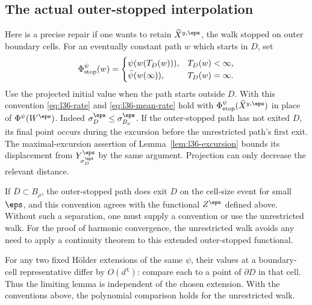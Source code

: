 \subsection{The actual outer-stopped interpolation}\label{sec:l36-outer}
Here is a precise repair if one wants to retain
$\widehat X^{y,\eps}$, the walk stopped on outer boundary cells. For an eventually
constant path $w$ which starts in $D$, set
\[
 \Phi^\psi_{\rm stop}(w)=
 \begin{cases}
 \psi(w(T_D(w))),&T_D(w)<\infty,\\
 \bar\psi(w(\infty)),&T_D(w)=\infty.
 \end{cases}
\]
Use the projected initial value when the path starts outside $D$.
With this convention \eqref{eq:l36-rate} and \eqref{eq:l36-mean-rate}
hold with $\Phi^\psi_{\rm stop}(\widehat X^{y,\eps})$ in place
of $\Phi^\psi(W^\eps)$. Indeed $\sigma_D^\eps\le
\sigma_{B_\rho}^\eps$. If the outer-stopped path has not exited
$D$, its final point occurs during the excursion before the
unrestricted path's first exit. The maximal-excursion assertion
of Lemma~\ref{lem:l36-excursion} bounds its displacement from
$Y^\eps_{\sigma_D^\eps}$ by the same argument.
Projection can only decrease the relevant distance.

If $\overline D\subset B_\rho$, the outer-stopped path does exit
$D$ on the cell-size event for small $\eps$, and this convention
agrees with the functional $Z^\eps$ defined above. Without such a separation,
one must supply a convention or use the unrestricted walk.
For the proof of harmonic convergence, the unrestricted walk
avoids any need to apply a continuity theorem to this extended
outer-stopped functional.

For any two fixed H\"older extensions of the same $\psi$, their
values at a boundary-cell representative differ by $O(d^\chi)$:
compare each to a point of $\partial D$ in that cell.
Thus the limiting lemma is independent of the chosen extension.
With the conventions above, the polynomial comparison holds for the unrestricted walk.
